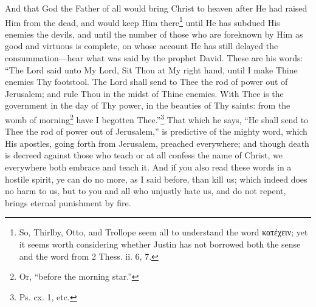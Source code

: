 
And that God the Father of all would bring Christ to heaven after He had raised Him from the dead, and would keep Him there\footnote{So, Thirlby, Otto, and Trollope seem all to understand the word \textgreek{κατέχειν}; yet it seems worth considering whether Justin has not borrowed both the sense and the word from 2 Thess. ii. 6, 7.} until He has subdued His enemies the devils, and until the number of those who are foreknown by Him as good and virtuous is complete, on whose account He has still delayed the consummation—hear what was said by the prophet David. These are his words: “The Lord said unto My Lord, Sit Thou at My right hand, until I make Thine enemies Thy footstool. The Lord shall send to Thee the rod of power out of Jerusalem; and rule Thou in the midst of Thine enemies. With Thee is the government in the day of Thy power, in the beauties of Thy saints: from the womb of morning\footnote{Or, “before the morning star.”} have I begotten Thee.”\footnote{Ps. cx. 1, etc.} That which he says, “He shall send to Thee the rod of power out of Jerusalem,” is predictive of the mighty word, which His apostles, going forth from Jerusalem, preached everywhere; and though death is decreed against those who teach or at all confess the name of Christ, we everywhere both embrace and teach it. And if you also read these words in a hostile spirit, ye can do no more, as I said before, than kill us; which indeed does no harm to us, but to you and all who unjustly hate us, and do not repent, brings eternal punishment by fire.


